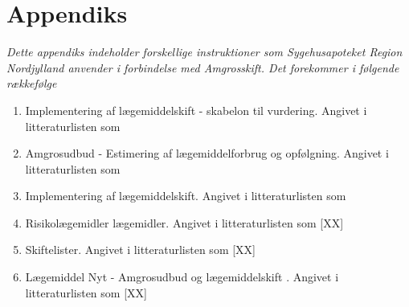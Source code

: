 \chapter{Appendiks} \label{cha:AppD}
\textit{Dette appendiks indeholder forskellige instruktioner som Sygehusapoteket Region Nordjylland anvender i forbindelse med Amgrosskift. Det forekommer i følgende rækkefølge}

\begin{enumerate}
\item Implementering af lægemiddelskift - skabelon til vurdering. Angivet i litteraturlisten som~\citep{Sygehusapoteket2017}
\item Amgrosudbud - Estimering af lægemiddelforbrug og opfølgning. Angivet i litteraturlisten som~\citep{Sygehusapoteket2017a}
\item Implementering af lægemiddelskift. Angivet i litteraturlisten som~\citep{Sygehusapoteket2017b}
\item Risikolægemidler lægemidler. \label{item:Risikolaegemidler} Angivet i litteraturlisten som [XX]
\item Skiftelister. Angivet i litteraturlisten som [XX] \label{item:Skiftelister}
\item Lægemiddel Nyt - Amgrosudbud og lægemiddelskift \label{item:Laegemiddelnyt}. Angivet i litteraturlisten som [XX] 
\end{enumerate}






